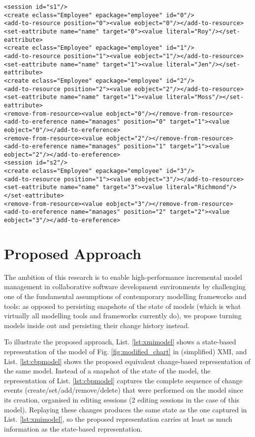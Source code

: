 \begin{lstlisting}[style=xml,caption={Change-based representation of the model of Figure \ref{fig:modified_chart}.},label=lst:cbpmodel]
<session id="s1"/>
<create eclass="Employee" epackage="employee" id="0"/>
<add-to-resource position="0"><value eobject="0"/></add-to-resource>
<set-eattribute name="name" target="0"><value literal="Roy"/></set-eattribute>
<create eclass="Employee" epackage="employee" id="1"/>
<add-to-resource position="1"><value eobject="1"/></add-to-resource>
<set-eattribute name="name" target="1"><value literal="Jen"/></set-eattribute>
<create eclass="Employee" epackage="employee" id="2"/>
<add-to-resource position="2"><value eobject="2"/></add-to-resource>
<set-eattribute name="name" target="1"><value literal="Moss"/></set-eattribute>
<remove-from-resource><value eobject="0"/></remove-from-resource>
<add-to-ereference name="manages" position="0" target="1"><value eobject="0"/></add-to-ereference>
<remove-from-resource><value eobject="2"/></remove-from-resource>
<add-to-ereference name="manages" position="1" target="1"><value eobject="2"/></add-to-ereference>
<session id="s2"/>
<create eclass="Employee" epackage="employee" id="3"/>
<add-to-resource position="1"><value eobject="3"/></add-to-resource>
<set-eattribute name="name" target="3"><value literal="Richmond"/></set-eattribute>
<remove-from-resource><value eobject="3"/></remove-from-resource>
<add-to-ereference name="manages" position="2" target="2"><value eobject="3"/></add-to-ereference>
\end{lstlisting}

\section{Proposed Approach}
\label{sec:proposed_approach}
The ambition of this research is to enable high-performance incremental model management in collaborative software development environments by challenging one of the fundamental assumptions of contemporary modelling frameworks and tools: as opposed to persisting snapshots of the state of models (which is what virtually all modelling tools and frameworks currently do), we propose turning models inside out and persisting their change history instead.

To illustrate the proposed approach, List. \ref{lst:xmimodel} shows a state-based representation of the model of Fig. \ref{fig:modified_chart} in (simplified) XMI, and List. \ref{lst:cbpmodel} shows the proposed equivalent change-based representation of the same model. Instead of a snapshot of the state of the model, the representation of List. \ref{lst:cbpmodel} captures the complete sequence of change events (create/set/add/remove/delete) that were performed on the model since its creation, organised in editing sessions (2 editing sessions in the case of this model). Replaying these changes produces the same state as the one captured in List. \ref{lst:xmimodel}, so the proposed representation carries at least as much information as the state-based representation.

